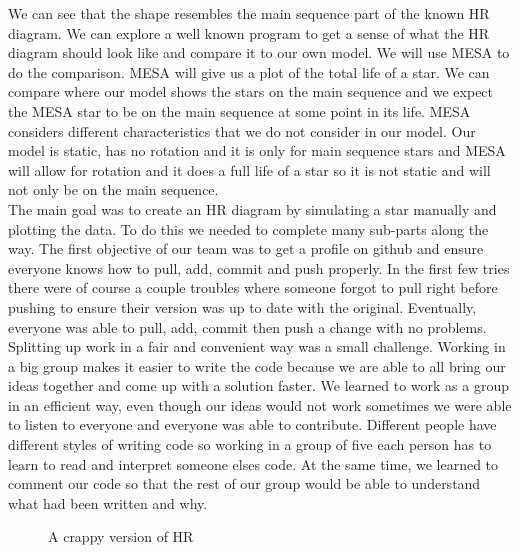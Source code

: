 \documentclass[10pt]{article}
\begin{document}
We can see that the shape resembles the main sequence part of the known HR diagram. We can explore a well known program to get a sense of what the HR diagram should look like and compare it to our own model. We will use MESA to do the comparison. MESA will give us a plot of the total life of a star. We can compare where our model shows the stars on the main sequence and we expect the MESA star to be on the main sequence at some point in its life. MESA considers different characteristics that  we do not consider in our model. Our model is static, has no rotation and it is only for main sequence stars and MESA will allow for rotation and it does a full life of a star so it is not static and will not only be on the main sequence. \\ 

The main goal was to create an HR diagram by simulating a star manually and plotting the data. To do this we needed to complete many sub-parts along the way. The first objective of our team was to get a profile on github and ensure everyone knows how to pull, add, commit and push properly. In the first few tries there were of course a couple troubles where someone forgot to pull right before pushing to ensure their version was up to date with the original. Eventually, everyone was able to pull, add, commit then push a change with no problems. Splitting up work in a fair and convenient way was a small challenge. Working in a big group makes it easier to write the code because we are able to all bring our ideas together and come up with a solution faster. We learned to work as a group in an efficient way, even though our ideas would not work sometimes we were able to listen to everyone and everyone was able to contribute. Different people have different styles of writing code so working in a group of five each person has to learn to read and interpret someone elses code. At the same time, we learned to comment our code so that the rest of our group would be able to understand what had been written and why.\\


\begin{figure}[p]
\begin{centering}

\caption{A crappy version of HR}
\label{fig:badHR}
\end{centering}
\end{figure}
\end{document}
